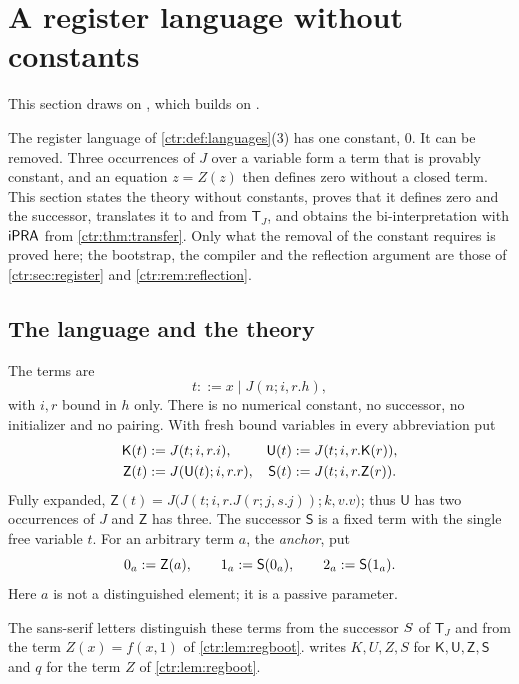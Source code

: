 \section{A register language without constants}\label{ctr:sec:constfree}

This section draws on , which builds on .

The register language of \cref{ctr:def:languages}(3) has one constant, $0$. It can be
removed. Three occurrences of $J$ over a variable form a term that is provably constant,
and an equation $z=Z(z)$ then defines zero without a closed term. This section states the
theory without constants, proves that it defines zero and the successor, translates it to
and from $\mathsf T_J$, and obtains the bi-interpretation with $\mathsf{iPRA}$ from
\cref{ctr:thm:transfer}. Only what the removal of the constant requires is proved here; the
bootstrap, the compiler and the reflection argument are those of \cref{ctr:sec:register}
and \cref{ctr:rem:reflection}.

\subsection{The language and the theory}

\begin{definition}\label{ctr:def:cfterms}
The terms are
\[
 t ::= x\mid J(n;i,r.h),
\]
with $i,r$ bound in $h$ only. There is no numerical constant, no successor, no initializer
and no pairing. With fresh bound variables in every abbreviation put
\begin{align*}
 \mathsf K(t)&\mathrel{:=} J(t;i,r.i), & \mathsf U(t)&\mathrel{:=} J(t;i,r.\mathsf K(r)),\\
 \mathsf Z(t)&\mathrel{:=} J(\mathsf U(t);i,r.r), & \mathsf S(t)&\mathrel{:=} J(t;i,r.\mathsf Z(r)).
\end{align*}
Fully expanded, $\mathsf Z(t)=J\bigl(J(t;i,r.J(r;j,s.j));k,v.v\bigr)$; thus $\mathsf U$ has
two occurrences of $J$ and $\mathsf Z$ has three. The successor $\mathsf S$ is a fixed term
with the single free variable $t$. For an arbitrary term $a$, the \emph{anchor}, put
\[
 0_a\mathrel{:=}\mathsf Z(a),\qquad 1_a\mathrel{:=}\mathsf S(0_a),\qquad 2_a\mathrel{:=}\mathsf S(1_a).
\]
Here $a$ is not a distinguished element; it is a passive parameter.
\end{definition}

The sans-serif letters distinguish these terms from the successor $S$ of $\mathsf T_J$
and from the term $Z(x)=f(x,1)$ of \cref{ctr:lem:regboot}.  writes
$K,U,Z,S$ for $\mathsf K,\mathsf U,\mathsf Z,\mathsf S$ and $q$ for the term $Z$ of
\cref{ctr:lem:regboot}.

